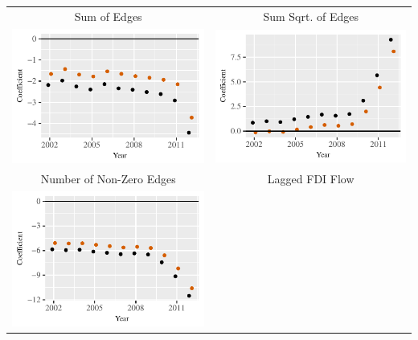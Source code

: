 \documentclass[reqno,onecolumn,letterpaper,12pt]{article}
\begin{document}
\pagebreak
\begin{longtable}[!h]{c@{\hskip -.4cm}c}
Sum of Edges&
Sum Sqrt. of Edges\\
\includegraphics[height=.2\textheight, clip=true, trim=0cm .5cm 0cm .1cm]{draft_figures/rl_plots/Sum.pdf}    &
\includegraphics[height=.2\textheight, clip=true, trim=.5cm .5cm 0cm .1cm]{draft_figures/rl_plots/Sum_5.pdf}   \\
Number of Non-Zero Edges &
Lagged FDI Flow\\
\includegraphics[height=.2\textheight, clip=true, trim=0cm .5cm 0cm .1cm]{draft_figures/rl_plots/Nonzero.pdf} &

\end{longtable}
\end{document}
